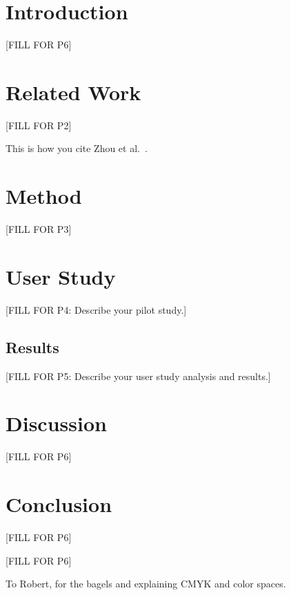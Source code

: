 \documentclass[sigconf,screen,review]{acmart}
\newcommand{\blue}[1]{{\color{blue}#1}}
\newcommand{\due}[1]{\blue{[FILL FOR {#1}]}}
\begin{document}
\maketitle

\section{Introduction}
\due{P6}

\section{Related Work}
\due{P2}

This is how you cite Zhou et al.~\cite{Zhou-06}. 

\section{Method}
\due{P3}

\section{User Study}
\due{P4: Describe your pilot study.}

\subsection{Results}
\due{P5: Describe your user study analysis and results.}


\section{Discussion}
\due{P6}

\section{Conclusion}
\due{P6}
\begin{acks}
\due{P6}

To Robert, for the bagels and explaining CMYK and color spaces.
\end{acks}
\end{document}
